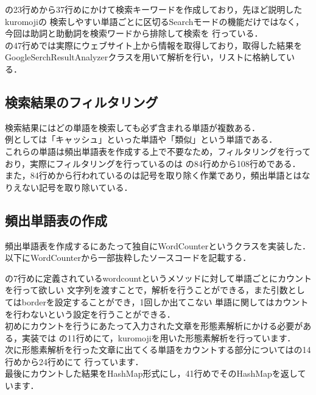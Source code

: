 の23行めから37行めにかけて検索キーワードを作成しており，先ほど説明したkuromojiの
検索しやすい単語ごとに区切るSearchモードの機能だけではなく，今回は助詞と助動詞を検索ワードから排除して検索を
行っている．\\

の47行めでは実際にウェブサイト上から情報を取得しており，取得した結果を
GoogleSerchResultAnalyzerクラスを用いて解析を行い，リストに格納している．\\



\subsection{検索結果のフィルタリング}
検索結果にはどの単語を検索しても必ず含まれる単語が複数ある．\\
例としては「キャッシュ」といった単語や「類似」という単語である．\\
これらの単語は頻出単語表を作成する上で不要なため，フィルタリングを行っており，実際にフィルタリングを行っているのは
の84行めから108行めである．
また，84行めから行われているのは記号を取り除く作業であり，頻出単語とはなりえない記号を取り除いている．\\

\subsection{頻出単語表の作成}
頻出単語表を作成するにあたって独自にWordCounterというクラスを実装した．\\

以下にWordCounterから一部抜粋したソースコードを記載する．



の7行めに定義されているwordcountというメソッドに対して単語ごとにカウントを行って欲しい
文字列を渡すことで，解析を行うことができる，また引数としてはborderを設定することができ，1回しか出てこない
単語に関してはカウントを行わないという設定を行うことができる．\\

初めにカウントを行うにあたって入力された文章を形態素解析にかける必要がある，実装では
の11行めにて，kuromojiを用いた形態素解析を行っています．
\\

次に形態素解析を行った文章に出てくる単語をカウントする部分についてはの14行めから24行めにて
行っています．\\

最後にカウントした結果をHashMap形式にし，41行めでそのHashMapを返しています．\\

